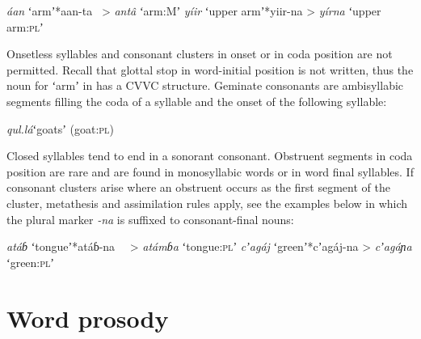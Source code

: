 \documentclass[output=paper]{LSP/langsci}
\begin{document}
\begin{exe}
	\ex \textit{áan}\hspace{9mm} ʻarmʼ\hspace{15mm}*aan-ta \ >\hspace{8mm} \textit{antâ}\hspace{8mm} ʻarm:Mʼ \label{ex:Petrollino:arm}
    \ex \textit{yíir}\hspace{9mm} ʻupper armʼ\hspace{5mm}*yiir-na >\hspace{7mm} \textit{yírna}\hspace{7mm} ʻupper arm:\textsc{pl}ʼ \label{ex:Petrollino:yiir}
\end{exe}

Onsetless syllables and consonant clusters in onset or in coda position are not permitted. Recall that glottal stop in word-initial position is not written, thus the noun for ʻarmʼ in  has a CVVC structure. Geminate consonants are ambisyllabic segments filling the coda of a syllable and the onset of the following syllable:

\begin{exe}
	\ex \textit{qul.lá}\hspace{8mm}ʻgoatsʼ (goat:\textsc{pl}) \label{ex:Petrollino:qul.lá}
\end{exe}

Closed syllables tend to end in a sonorant consonant. Obstruent segments in coda position are rare and are found in monosyllabic words or in word final syllables. If consonant clusters arise where an obstruent occurs as the first segment of the cluster, metathesis and assimilation rules apply, see the examples below in which the plural marker \textit{-na} is suffixed to consonant-final nouns:  

\begin{exe}
	\ex \textit{atáɓ}\hspace{9mm} ʻtongueʼ\hspace{10mm}*atáɓ-na \ \ >\hspace{6mm} \textit{atámɓa}\hspace{4mm} ʻtongue:\textsc{pl}ʼ
    \ex \textit{cʼagáj}\hspace{7mm} ʻgreenʼ\hspace{12mm}*cʼagáj-na >\hspace{6mm} \textit{cʼagáɲa}\hspace{4mm} ʻgreen:\textsc{pl}ʼ
\end{exe}

\section{Word prosody} \label{sec:Petrollino:3}
\end{document}
